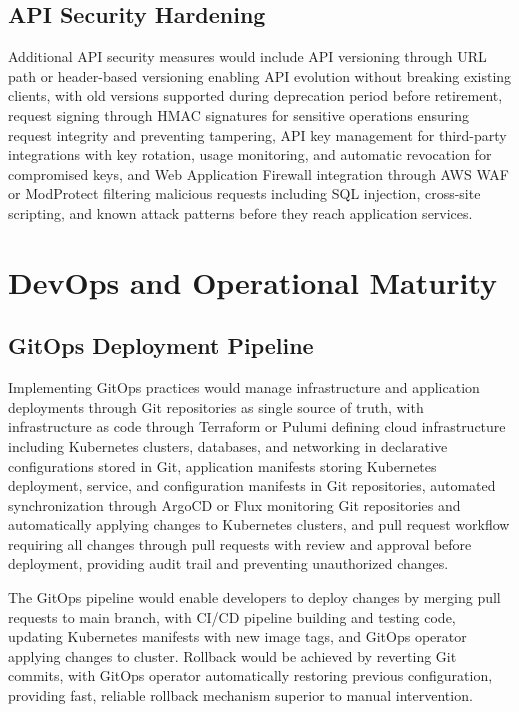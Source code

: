 \subsection{API Security Hardening}

Additional API security measures would include API versioning through URL path or header-based versioning enabling API evolution without breaking existing clients, with old versions supported during deprecation period before retirement, request signing through HMAC signatures for sensitive operations ensuring request integrity and preventing tampering, API key management for third-party integrations with key rotation, usage monitoring, and automatic revocation for compromised keys, and Web Application Firewall integration through AWS WAF or ModProtect filtering malicious requests including SQL injection, cross-site scripting, and known attack patterns before they reach application services.

\section{DevOps and Operational Maturity}

\subsection{GitOps Deployment Pipeline}

Implementing GitOps practices would manage infrastructure and application deployments through Git repositories as single source of truth, with infrastructure as code through Terraform or Pulumi defining cloud infrastructure including Kubernetes clusters, databases, and networking in declarative configurations stored in Git, application manifests storing Kubernetes deployment, service, and configuration manifests in Git repositories, automated synchronization through ArgoCD or Flux monitoring Git repositories and automatically applying changes to Kubernetes clusters, and pull request workflow requiring all changes through pull requests with review and approval before deployment, providing audit trail and preventing unauthorized changes.

The GitOps pipeline would enable developers to deploy changes by merging pull requests to main branch, with CI/CD pipeline building and testing code, updating Kubernetes manifests with new image tags, and GitOps operator applying changes to cluster. Rollback would be achieved by reverting Git commits, with GitOps operator automatically restoring previous configuration, providing fast, reliable rollback mechanism superior to manual intervention.


